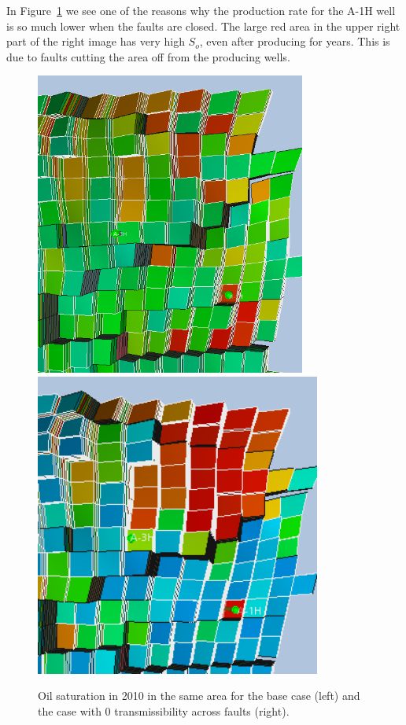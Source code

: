 \documentclass[final]{beamer}
\begin{document}
\begin{frame}[t]
\begin{multicols}{3}
In Figure~\ref{fig:faults_3d} we see one of the reasons why the production rate for the A-1H well is so much lower when the faults are closed. The large red area in the upper right part of the right image has very high $S_o$, even after producing for years. This is due to faults cutting the area off from the producing wells.

\begin{figure}[H]
  \begin{center}
    \includegraphics[clip=true, width=0.5\columnwidth, height=10cm]{images/soil_2010_base.png}
    \includegraphics[clip=true, width=0.5\columnwidth, height=10cm]{images/soil_2010_multfl_0.png}
  \end{center}
  \caption{Oil saturation in 2010 in the same area for the base case (left) and the case with 0 transmissibility across faults (right).}
  \label{fig:faults_3d}
\end{figure}











\end{multicols}
\end{frame}
\end{document}
